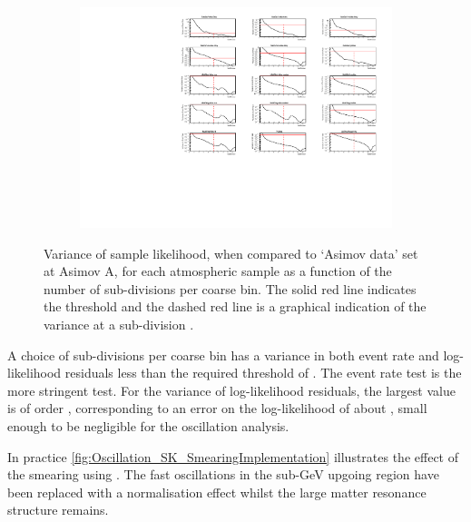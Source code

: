 \begin{figure}[h]
  \begin{subfigure}[t]{\textwidth}
    \includegraphics[width=\textwidth, trim={0mm 0mm 0mm 0mm}, clip,page=1]{Figures/Oscillation/EventRate_VarianceGraphs.pdf}
  \end{subfigure}
  \caption{Variance of sample likelihood, when compared to `Asimov data' set at Asimov A, for each atmospheric sample as a function of the number of sub-divisions per coarse bin. The solid red line indicates the  threshold and the dashed red line is a graphical indication of the variance at a sub-division .}
  \label{fig:Oscillation_SK_LLHVariance}
\end{figure}

A choice of  sub-divisions per coarse bin has a variance in both event rate and log-likelihood residuals less than the required threshold of . The event rate test is the more stringent test. For the variance of log-likelihood residuals, the largest value is of order , corresponding to an error on the log-likelihood of about , small enough to be negligible for the oscillation analysis.

In practice \autoref{fig:Oscillation_SK_SmearingImplementation} illustrates the effect of the smearing using . The fast oscillations in the sub-GeV upgoing region have been replaced with a normalisation effect whilst the large matter resonance structure remains.

